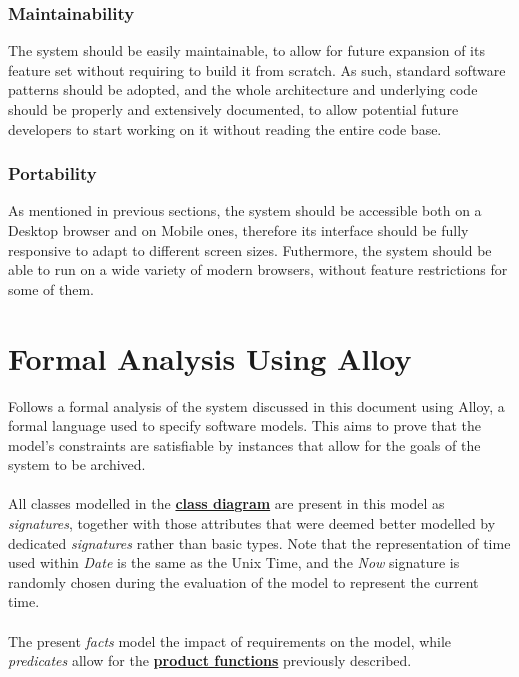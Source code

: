 \documentclass[11pt]{article}
\begin{document}
\subsubsection{Maintainability}
The system should be easily maintainable, to allow for future expansion of its feature set without requiring to build it from scratch. As such, standard software patterns should be adopted, and the whole architecture and underlying code should be properly and extensively documented, to allow potential future developers to start working on it without reading the entire code base.

\subsubsection{Portability}
As mentioned in previous sections, the system should be accessible both on a Desktop browser and on Mobile ones, therefore its interface should be fully responsive to adapt to different screen sizes. Futhermore, the system should be able to run on a wide variety of modern browsers, without feature restrictions for some of them.

\newpage

\section{Formal Analysis Using Alloy}
\label{section:alloy}

Follows a formal analysis of the system discussed in this document using Alloy, a formal language used to specify software models. This aims to prove that the model's constraints are satisfiable by instances that allow for the goals of the system to be archived.\\
\\
All classes modelled in the \hyperref[subsection:classDiagram]{\textbf{class diagram}} are present in this model as \textit{signatures}, together with those attributes that were deemed better modelled by dedicated \textit{signatures} rather than basic types. Note that the representation of time used within \textit{Date} is the same as the Unix Time, and the \textit{Now} signature is randomly chosen during the evaluation of the model to represent the current time. \\
\\
The present \textit{facts} model the impact of requirements on the model, while \textit{predicates} allow for the \hyperref[subsec:prodfunctions]{\textbf{product functions}} previously described. \\
\end{document}
